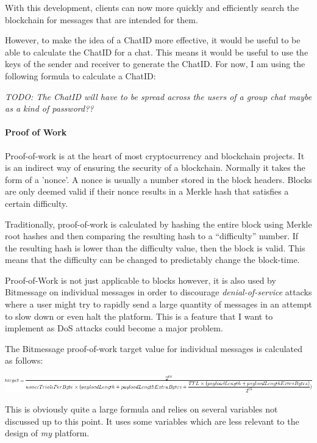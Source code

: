 \documentclass{article}
\begin{document}
With this development, clients can now more quickly and efficiently search the blockchain for messages that are intended for them.

However, to make the idea of a ChatID more effective, it would be useful to be able to calculate the ChatID for a chat. This means it would be useful to use the keys of the sender and receiver to generate the ChatID. For now, I am using the following formula to calculate a ChatID:

\textit{TODO: The ChatID will have to be spread across the users of a group chat maybe as a kind of password??}

\paragraph{Proof of Work}
Proof-of-work is at the heart of most cryptocurrency and blockchain projects. It is an indirect way of ensuring the security of a blockchain. Normally it takes the form of a 'nonce'. A nonce is usually a number stored in the block headers. Blocks are only deemed valid if their nonce results in a Merkle hash that satisfies a certain difficulty.

Traditionally, proof-of-work is calculated by hashing the entire block using Merkle root hashes and then comparing the resulting hash to a ``difficulty'' number. If the resulting hash is lower than the difficulty value, then the block is valid. This means that the difficulty can be changed to predictably change the block-time. 



Proof-of-Work is not just applicable to blocks however, it is also used by Bitmessage on individual messages in order to discourage \textit{denial-of-service}\cite{bitmessage_pow} attacks where a user might try to rapidly send a large quantity of messages in an attempt to slow down or even halt the platform. This is a feature that I want to implement as DoS attacks could become a major problem.

The Bitmessage proof-of-work target value for individual messages is calculated as follows:

\begin{center}
\includegraphics[width=\linewidth]{Images/Diagrams/bitmessage_pow.png}
\end{center}

This is obviously quite a large formula and relies on several variables not discussed up to this point. It uses some variables which are less relevant to the design of \textit{my} platform.
\end{document}
